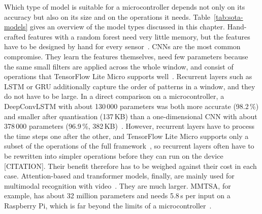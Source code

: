 Which type of model is suitable for a microcontroller depends not only on its
accuracy but also on its size and on the operations it needs.
Table~\ref{tab:sota-models} gives an overview of the model types discussed in
this chapter. Hand-crafted features with a random forest need very little
memory, but the features have to be designed by hand for every
sensor~\cite{chatterjee2020laso, koch2024recognition}. CNNs are the most common
compromise. They learn the features themselves, need few parameters because the
same small filters are applied across the whole window, and consist of
operations that TensorFlow Lite Micro supports well~\cite{david2021tflm,
zhou2025efficient}. Recurrent layers such as LSTM or GRU additionally capture
the order of patterns in a window, and they do not have to be large. In a direct
comparison on a microcontroller, a DeepConvLSTM with about 130\,000 parameters
was both more accurate (98.2\,\%) and smaller after quantisation (137\,KB) than
a one-dimensional CNN with about 378\,000 parameters (96.9\,\%,
382\,KB)~\cite{zhou2025efficient}. However, recurrent layers have to process the
time steps one after the other, and TensorFlow Lite Micro supports only a subset
of the operations of the full framework~\cite{david2021tflm}, so recurrent layers
often have to be rewritten into simpler operations before they can run on the
device {[}CITATION{]}. Their benefit therefore has to be weighed against their
cost in each case. Attention-based and transformer models, finally, are mainly
used for multimodal recognition with video~\cite{gao2023mmtsa,
bonyani2026multimodal}. They are much larger. MMTSA, for example, has about 32
million parameters and needs 5.8\,s per input on a Raspberry Pi, which is far
beyond the limits of a microcontroller~\cite{gao2023mmtsa}.

